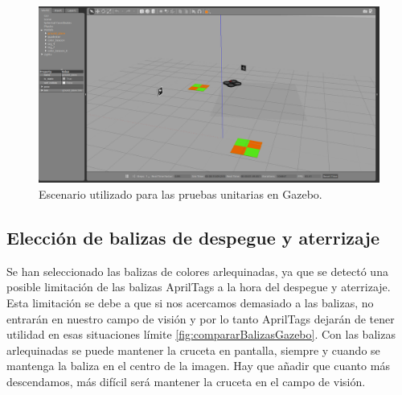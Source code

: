 \begin{figure}[H]
	\begin{center}
		\includegraphics[width=1\textwidth]{imag/gazebo.png}
		\caption{Escenario utilizado para las pruebas unitarias en Gazebo.}
		\label{fig:Escenario Gazebo pruebas.}	
	\end{center}
\end{figure}

\subsection{Elección de balizas de despegue y aterrizaje}

Se han seleccionado las balizas de colores arlequinadas, ya que se detectó una posible limitación de las balizas AprilTags a la hora del despegue y aterrizaje. Esta limitación se debe a que si nos acercamos demasiado a las balizas, no entrarán en nuestro campo de visión y por lo tanto AprilTags dejarán de tener utilidad en esas situaciones límite \ref{fig:compararBalizasGazebo}. Con las balizas arlequinadas se puede mantener la cruceta en pantalla, siempre y cuando se mantenga la baliza en el centro de la imagen. Hay que añadir que cuanto más descendamos, más difícil será mantener la cruceta en el campo de visión.

